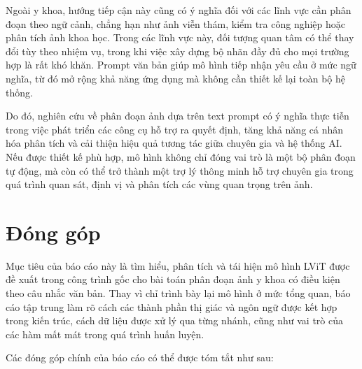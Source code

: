     Ngoài y khoa, hướng tiếp cận này cũng có ý nghĩa đối với các lĩnh vực cần phân đoạn theo ngữ cảnh, chẳng hạn như ảnh viễn thám, kiểm tra công nghiệp hoặc phân tích ảnh khoa học. Trong các lĩnh vực này, đối tượng quan tâm có thể thay đổi tùy theo nhiệm vụ, trong khi việc xây dựng bộ nhãn đầy đủ cho mọi trường hợp là rất khó khăn. Prompt văn bản giúp mô hình tiếp nhận yêu cầu ở mức ngữ nghĩa, từ đó mở rộng khả năng ứng dụng mà không cần thiết kế lại toàn bộ hệ thống.

    Do đó, nghiên cứu về phân đoạn ảnh dựa trên text prompt có ý nghĩa thực tiễn trong việc phát triển các công cụ hỗ trợ ra quyết định, tăng khả năng cá nhân hóa phân tích và cải thiện hiệu quả tương tác giữa chuyên gia và hệ thống AI. Nếu được thiết kế phù hợp, mô hình không chỉ đóng vai trò là một bộ phân đoạn tự động, mà còn có thể trở thành một trợ lý thông minh hỗ trợ chuyên gia trong quá trình quan sát, định vị và phân tích các vùng quan trọng trên ảnh.

\section{Đóng góp}
Mục tiêu của báo cáo này là tìm hiểu, phân tích và tái hiện mô hình LViT được đề xuất trong công trình gốc cho bài toán phân đoạn ảnh y khoa có điều kiện theo câu nhắc văn bản. Thay vì chỉ trình bày lại mô hình ở mức tổng quan, báo cáo tập trung làm rõ cách các thành phần thị giác và ngôn ngữ được kết hợp trong kiến trúc, cách dữ liệu được xử lý qua từng nhánh, cũng như vai trò của các hàm mất mát trong quá trình huấn luyện.

Các đóng góp chính của báo cáo có thể được tóm tắt như sau:

